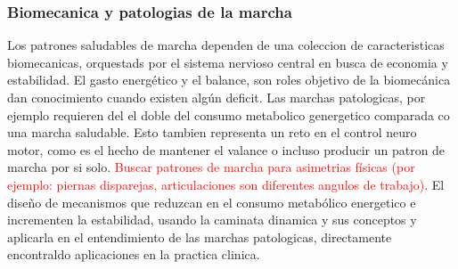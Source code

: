 \documentclass[10pt,onecolumn,twoside,letterpaper]{article}
\begin{document}
\subsubsection{Biomecanica y patologias de la marcha}
Los patrones saludables de marcha dependen de una coleccion de caracteristicas biomecanicas, orquestads por el sistema nervioso central en busca de economia y estabilidad. El gasto energ\'etico y el balance, son roles objetivo de la biomec\'anica dan conocimiento cuando existen alg\'un deficit. Las marchas patologicas, por ejemplo requieren del el doble del consumo metabolico genergetico comparada co una marcha saludable. Esto tambien representa un reto en el control neuro motor, como es el hecho de mantener el valance o incluso producir un patron de marcha por si solo. \textcolor{red}{Buscar patrones de marcha para asimetrias f\'isicas (por ejemplo: piernas disparejas, articulaciones son diferentes angulos de trabajo)}\cite{Kuo2010}.
El dise\~no de mecanismos que reduzcan en el consumo metab\'olico energetico e incrementen la estabilidad, usando la caminata dinamica y sus conceptos y aplicarla en el entendimiento de las marchas patologicas, directamente encontraldo aplicaciones en la practica clinica.\cite{Kuo2010}
\end{document}
